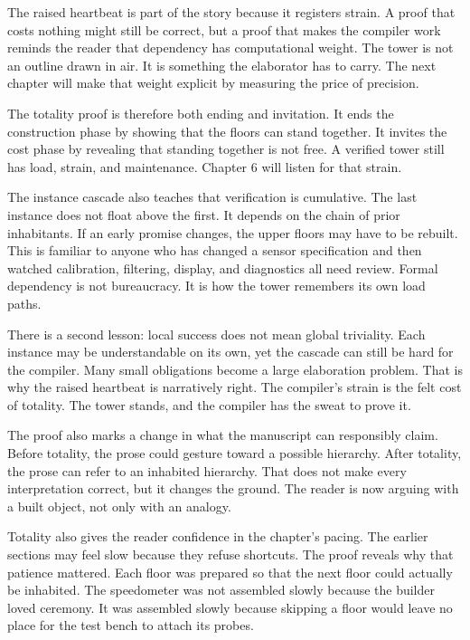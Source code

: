 The raised heartbeat is part of the story because it registers strain. A proof
that costs nothing might still be correct, but a proof that makes the compiler
work reminds the reader that dependency has computational weight. The tower is
not an outline drawn in air. It is something the elaborator has to carry. The
next chapter will make that weight explicit by measuring the price of
precision.

The totality proof is therefore both ending and invitation. It ends the
construction phase by showing that the floors can stand together. It invites
the cost phase by revealing that standing together is not free. A verified
tower still has load, strain, and maintenance. Chapter 6 will listen for that
strain.

The instance cascade also teaches that verification is cumulative. The last
instance does not float above the first. It depends on the chain of prior
inhabitants. If an early promise changes, the upper floors may have to be
rebuilt. This is familiar to anyone who has changed a sensor specification and
then watched calibration, filtering, display, and diagnostics all need review.
Formal dependency is not bureaucracy. It is how the tower remembers its own
load paths.

There is a second lesson: local success does not mean global triviality. Each
instance may be understandable on its own, yet the cascade can still be hard
for the compiler. Many small obligations become a large elaboration problem.
That is why the raised heartbeat is narratively right. The compiler's strain
is the felt cost of totality. The tower stands, and the compiler has the
sweat to prove it.

The proof also marks a change in what the manuscript can responsibly claim.
Before totality, the prose could gesture toward a possible hierarchy. After
totality, the prose can refer to an inhabited hierarchy. That does not make
every interpretation correct, but it changes the ground. The reader is now
arguing with a built object, not only with an analogy.

Totality also gives the reader confidence in the chapter's pacing. The earlier
sections may feel slow because they refuse shortcuts. The proof reveals why
that patience mattered. Each floor was prepared so that the next floor could
actually be inhabited. The speedometer was not assembled slowly because the
builder loved ceremony. It was assembled slowly because skipping a floor would
leave no place for the test bench to attach its probes.

